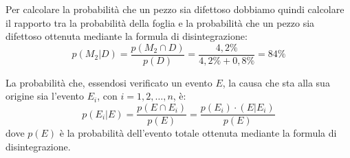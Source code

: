 \documentclass{article}     %
\begin{document}
\begin{ex}
                                                Per calcolare la probabilità che un pezzo sia difettoso dobbiamo quindi calcolare il rapporto tra la probabilità della foglia e la probabilità che un pezzo sia difettoso ottenuta mediante la formula di disintegrazione:
                                                \[p(M_2|D)=\frac{p(M_2\cap D)}{p(D)}=\frac{4,2\%}{4,2\%+0,8\%}=84\%\]
                                            \end{ex}
                    \begin{thm}
                        La probabilità che, essendosi verificato un evento $E$, la causa che sta alla sua origine sia l'evento $E_i$, con $i=1,2,\dots, n$, è:
                        \[p(E_i|E)=\frac{p(E\cap E_i)}{p(E)}=\frac{p(E_i)\cdotp(E|E_i)}{p(E)}\]
                        dove $p(E)$ è la probabilità dell'evento totale ottenuta mediante la formula di disintegrazione. 
                    \end{thm}
\end{document}
